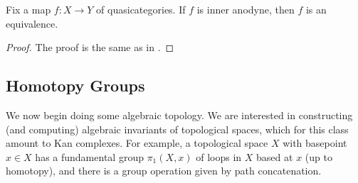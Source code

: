 \documentclass[../notes.tex]{subfiles}
\begin{document}
\begin{proposition}
	Fix a map $f\colon X\to Y$ of quasicategories. If $f$ is inner anodyne, then $f$ is an equivalence.
\end{proposition}
\begin{proof}
	The proof is the same as in .
\end{proof}

\subsection{Homotopy Groups}
We now begin doing some algebraic topology. We are interested in constructing (and computing) algebraic invariants of topological spaces, which for this class amount to Kan complexes. For example, a topological space $X$ with basepoint $x\in X$ has a fundamental group $\pi_1(X,x)$ of loops in $X$ based at $x$ (up to homotopy), and there is a group operation given by path concatenation.
\end{document}

